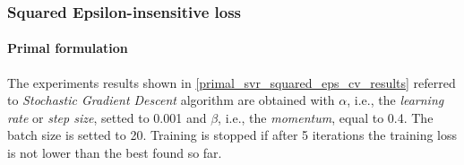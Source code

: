 



\newpage

\subsubsection{Squared Epsilon-insensitive loss}

\paragraph{Primal formulation}

The experiments results shown in \ref{primal_svr_squared_eps_cv_results} referred to \emph{Stochastic Gradient Descent} algorithm are obtained with $\alpha$, i.e., the \emph{learning rate} or \emph{step size}, setted to 0.001 and $\beta$, i.e., the \emph{momentum}, equal to 0.4. The batch size is setted to 20. Training is stopped if after 5 iterations the training loss is not lower than the best found so far.

